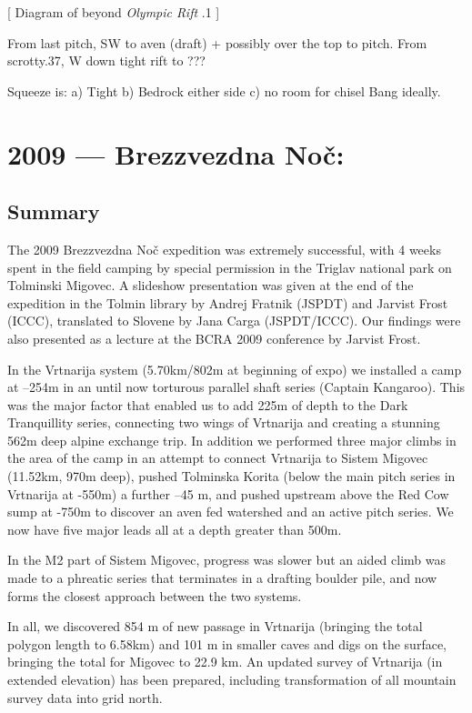 {[} Diagram of beyond \emph{Olympic Rift} .1 {]}

From last pitch, SW to aven (draft) + possibly over the top to pitch.
From scrotty.37, W down tight rift to ???

Squeeze is: a) Tight b) Bedrock either side c) no room for chisel Bang
ideally.


\hypertarget{brezzvezdna-noux10d}{%
\chapter{2009 --- Brezzvezdna Noč:}\label{brezzvezdna-noux10d}}

\hypertarget{summary}{%
\section{Summary}\label{summary}}

The 2009 Brezzvezdna Noč expedition was extremely successful, with 4
weeks spent in the field camping by special permission in the Triglav
national park on Tolminski Migovec. A slideshow presentation was given
at the end of the expedition in the Tolmin library by Andrej Fratnik
(JSPDT) and Jarvist Frost (ICCC), translated to Slovene by Jana Carga
(JSPDT/ICCC). Our findings were also presented as a lecture at the BCRA
2009 conference by Jarvist Frost.

In the Vrtnarija system (5.70km/802m at beginning of expo) we installed
a camp at --254m in an until now torturous parallel shaft series
(Captain Kangaroo). This was the major factor that enabled us to add
225m of depth to the Dark Tranquillity series, connecting two wings of
Vrtnarija and creating a stunning 562m deep alpine exchange trip. In
addition we performed three major climbs in the area of the camp in an
attempt to connect Vrtnarija to Sistem Migovec (11.52km, 970m deep),
pushed Tolminska Korita (below the main pitch series in Vrtnarija at
-550m) a further --45 m, and pushed upstream above the Red Cow sump at
-750m to discover an aven fed watershed and an active pitch series. We
now have five major leads all at a depth greater than 500m.

In the M2 part of Sistem Migovec, progress was slower but an aided climb
was made to a phreatic series that terminates in a drafting boulder
pile, and now forms the closest approach between the two systems.

In all, we discovered 854 m of new passage in Vrtnarija (bringing the
total polygon length to 6.58km) and 101 m in smaller caves and digs on
the surface, bringing the total for Migovec to 22.9 km. An updated
survey of Vrtnarija (in extended elevation) has been prepared, including
transformation of all mountain survey data into grid north.

